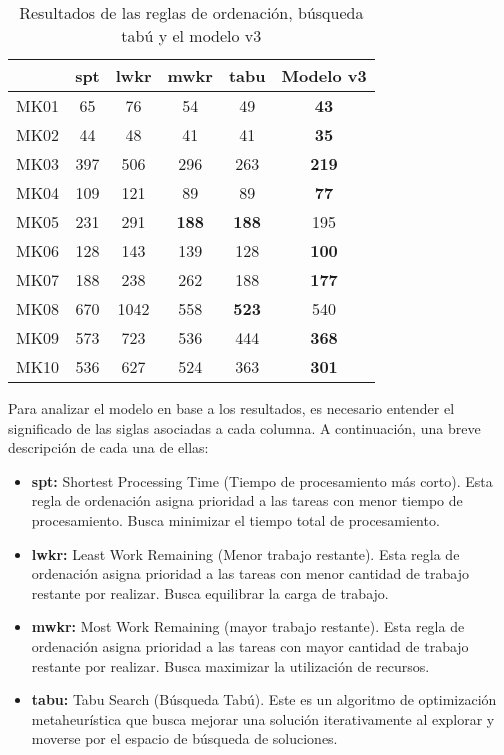 \begin{table}[ht]
    \centering
    \begin{tabular}[ht]{|l|ccccc|}
        \hline
                  & spt & lwkr & mwkr & tabu & Modelo v3\\
        \hline
        MK01      & 65      & 76    & 54    & 49   & \textbf{43}  \\
        MK02      & 44      & 48    & 41    & 41   & \textbf{35}  \\
        MK03      & 397     & 506   & 296   & 263  & \textbf{219} \\
        MK04      & 109     & 121   & 89    & 89   & \textbf{77}  \\
        MK05      & 231     & 291   & \textbf{188} & \textbf{188}  & 195 \\
        MK06      & 128     & 143   & 139   & 128  & \textbf{100} \\
        MK07      & 188     & 238   & 262   & 188  & \textbf{177} \\
        MK08      & 670     & 1042  & 558   & \textbf{523}  & 540 \\
        MK09      & 573     & 723   & 536   & 444  & \textbf{368} \\
        MK10      & 536     & 627   & 524   & 363  & \textbf{301} \\
        \hline
    \end{tabular}
    \caption{Resultados de las reglas de ordenación, búsqueda tabú y el modelo v3}
\end{table}

Para analizar el modelo en base a los resultados, 
es necesario entender el significado de las siglas asociadas a cada 
columna. A continuación, una breve descripción de cada una de ellas:

\begin{itemize}
    \item \textbf{spt:} Shortest Processing Time (Tiempo de procesamiento 
    más corto). Esta regla de ordenación asigna prioridad a las tareas con 
    menor tiempo de procesamiento. Busca minimizar el tiempo total de procesamiento.
    \item \textbf{lwkr:} Least Work Remaining (Menor trabajo restante). Esta 
    regla de ordenación asigna prioridad a las tareas con menor cantidad de trabajo 
    restante por realizar. Busca equilibrar la carga de trabajo.
    \item \textbf{mwkr:} Most Work Remaining (mayor trabajo restante). Esta regla 
    de ordenación asigna prioridad a las tareas con mayor cantidad de trabajo restante 
    por realizar. Busca maximizar la utilización de recursos.
    \item \textbf{tabu:} Tabu Search (Búsqueda Tabú). Este es un algoritmo de optimización 
    metaheurística que busca mejorar una solución iterativamente al explorar y moverse por 
    el espacio de búsqueda de soluciones. 
\end{itemize}

